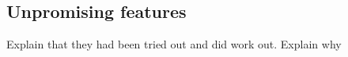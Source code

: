 \subsection{Unpromising features}
Explain that they had been tried out and did work out.
Explain why